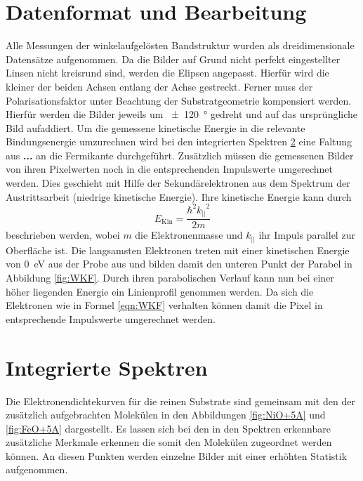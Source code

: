     \section{Datenformat und Bearbeitung}
        Alle Messungen der winkelaufgelösten Bandstruktur wurden als dreidimensionale Datensätze aufgenommen.
        Da die Bilder auf Grund nicht perfekt eingestellter Linsen nicht kreisrund sind, werden die Elipsen angepasst.
        Hierfür wird die kleiner der beiden Achsen entlang der Achse gestreckt.
        Ferner muss der Polarisationsfaktor unter Beachtung der Substratgeometrie kompensiert werden.
        Hierfür werden die Bilder jeweils um \SI{\pm120}{\degree} gedreht und auf das ursprüngliche Bild aufaddiert.
        Um die gemessene kinetische Energie in die relevante Bindungsenergie umzurechnen wird bei den integrierten Spektren \ref{sec:EDC} eine Faltung aus \textbf{...} an die Fermikante durchgeführt.
        Zusätzlich müssen die gemessenen Bilder von ihren Pixelwerten noch in die entsprechenden Impulswerte umgerechnet werden.
        Dies geschieht mit Hilfe der Sekundärelektronen aus dem Spektrum der Austrittsarbeit (niedrige kinetische Energie).
        Ihre kinetische Energie kann durch 
        \begin{equation}
            E_\text{Kin} = \frac{\hbar^2 {k_{||}}^2}{2 m}
            \label{eqn:WKF}
        \end{equation}
        beschrieben werden, wobei $m$ die Elektronenmasse und $k_{||}$ ihr Impuls parallel zur Oberfläche ist.
        Die langsamsten Elektronen treten mit einer kinetischen Energie von \SI{0}{\electronvolt} aus der Probe aus und bilden damit den unteren Punkt der Parabel in Abbildung \ref{fig:WKF}.
        Durch ihren parabolischen Verlauf kann nun bei einer höher liegenden Energie ein Linienprofil genommen werden.
        Da sich die Elektronen wie in Formel \eqref{eqn:WKF} verhalten können damit die Pixel in entsprechende Impulswerte umgerechnet werden.


    \section{Integrierte Spektren}
    \label{sec:EDC}
        Die Elektronendichtekurven für die reinen Substrate sind gemeinsam mit den der zusätzlich aufgebrachten Molekülen in den Abbildungen \ref{fig:NiO+5A} und \ref{fig:FeO+5A} dargestellt.
        Es lassen sich bei den in den Spektren erkennbare zusätzliche Merkmale erkennen die somit den Molekülen zugeordnet werden können.
        An diesen Punkten werden einzelne Bilder mit einer erhöhten Statistik aufgenommen.

